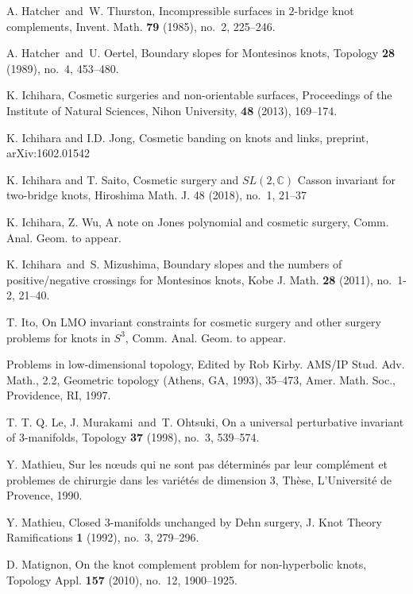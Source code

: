 \documentclass{amsart}
\theoremstyle{remark}
\theoremstyle{definition}
\begin{document}
\begin{thebibliography}{99}
A. Hatcher\ and\ W. Thurston, 
Incompressible surfaces in $2$-bridge knot complements, 
Invent. Math. {\bf 79} (1985), no.~2, 225--246. 

A. Hatcher\ and\ U. Oertel, 
Boundary slopes for Montesinos knots, 
Topology {\bf 28} (1989), no.~4, 453--480. 

K. Ichihara, 
Cosmetic surgeries and non-orientable surfaces, 
Proceedings of the Institute of Natural Sciences, Nihon University, {\bf 48} (2013), 169--174.

K. Ichihara and I.D. Jong, 
Cosmetic banding on knots and links, 
preprint, arXiv:1602.01542 

K. Ichihara and T. Saito, 
Cosmetic surgery and $SL(2,\mathbb{C})$ Casson invariant for two-bridge knots,
Hiroshima Math. J. 48 (2018), no.~1, 21--37

K. Ichihara, Z. Wu,
A note on Jones polynomial and cosmetic surgery, 
Comm. Anal. Geom. to appear.

K. Ichihara\ and\ S. Mizushima, 
Boundary slopes and the numbers of positive/negative crossings for Montesinos knots, 
Kobe J. Math. {\bf 28} (2011), no.~1-2, 21--40. 

T. Ito, 
On LMO invariant constraints for cosmetic surgery and other surgery problems for knots in $S^{3}$, 
Comm. Anal. Geom. to appear.


Problems in low-dimensional topology, 
Edited by Rob Kirby. 
AMS/IP Stud. Adv. Math., 2.2, Geometric topology (Athens, GA, 1993), 35--473, 
Amer. Math. Soc., Providence, RI, 1997. 


T. T. Q. Le, J. Murakami\ and\ T. Ohtsuki, 
On a universal perturbative invariant of $3$-manifolds, 
Topology {\bf 37} (1998), no.~3, 539--574. 


Y. Mathieu, 
Sur les n{\oe}uds qui ne sont pas d\'{e}termin\'{e}s par leur compl\'{e}ment et problemes de chirurgie dans les vari\'{e}t\'{e}s de dimension 3, 
Th\`{e}se, L'Universit\'{e} de Provence, 1990.

Y. Mathieu, 
Closed $3$-manifolds unchanged by Dehn surgery, 
J. Knot Theory Ramifications {\bf 1} (1992), no.~3, 279--296. 

D. Matignon, 
On the knot complement problem for non-hyperbolic knots, 
Topology Appl. {\bf 157} (2010), no.~12, 1900--1925. 


\end{thebibliography}
\end{document}

